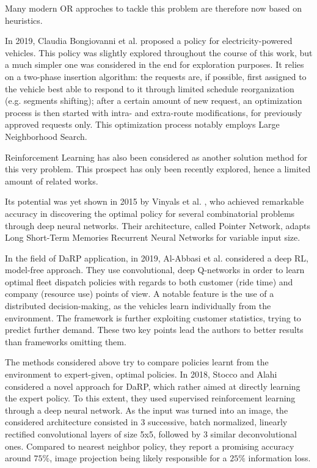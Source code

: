 \documentclass{article}
\begin{document}
Many modern OR approches to tackle this problem are therefore now based on heuristics.

In 2019, Claudia Bongiovanni et al. \cite{bongiovannilearning} proposed a policy for electricity-powered vehicles. 
This policy was slightly explored throughout the course of this work, but a much simpler one was considered in the end for exploration purposes.
It relies on a two-phase insertion algorithm:
the requests are, if possible, first assigned to the vehicle best able to respond to it through limited schedule reorganization (e.g. segments shifting);
after a certain amount of new request, an optimization process is then started with intra- and extra-route modifications, for previously approved requests only.
This optimization process notably employs Large Neighborhood Search.

Reinforcement Learning has also been considered as another solution method for this very problem.
This prospect has only been recently explored, hence a limited amount of related works.

Its potential was yet shown in 2015 by Vinyals et al. \cite{vinyals2015pointer},
who achieved remarkable accuracy in discovering the optimal policy for several combinatorial problems through deep neural networks.
Their architecture, called Pointer Network, adapts Long Short-Term Memories Recurrent Neural Networks for variable input size.

In the field of DaRP application, in 2019, Al-Abbasi et al. \cite{al2019deeppool} considered a deep RL, model-free approach.
They use convolutional, deep Q-networks in order to learn optimal fleet dispatch policies
with regards to both customer (ride time) and company (resource use) points of view.
A notable feature is the use of a distributed decision-making, as
the vehicles learn individually from the environment.
The framework is further exploiting customer statistics, trying to predict further demand.
These two key points lead the authors to better results than frameworks omitting them.

The methods considered above try to compare policies learnt from the environment to expert-given, optimal policies.
In 2018, Stocco and Alahi considered a novel approach for DaRP,
which rather aimed at directly learning the expert policy.
To this extent, they used supervised reinforcement learning through a deep neural network.
As the input was turned into an image, %
the considered architecture consisted in 3 successive, batch normalized, linearly rectified convolutional layers of size 5x5,
followed by 3 similar deconvolutional ones.
Compared to nearest neighbor policy, they report a promising accuracy around $75 \%$,
image projection being likely responsible for a $25\%$ information loss.
\end{document}
